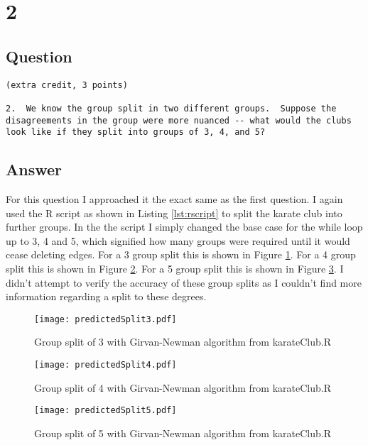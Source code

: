 \documentclass[letterpaper,11pt]{article}
\begin{document}
\clearpage


\section*{2}

\subsection*{Question}

\begin{verbatim}
(extra credit, 3 points)

2.  We know the group split in two different groups.  Suppose the
disagreements in the group were more nuanced -- what would the clubs
look like if they split into groups of 3, 4, and 5?
\end{verbatim}

\clearpage
\subsection*{Answer}

For this question I approached it the exact same as the first question. I again used the R script as shown in Listing \ref{lst:rscript} to split the karate club into further groups. In the the script I simply changed the base case for the while loop up to 3, 4 and 5, which signified how many groups were required until it would cease deleting edges. For a 3 group split this is shown in Figure \ref{fig:split3}. For a 4 group split this is shown in Figure \ref{fig:split4}. For a 5 group split this is shown in Figure \ref{fig:split5}. I didn't attempt to verify the accuracy of these group splits as I couldn't find more information regarding a split to these degrees.

\begin{figure}[h]
\centering
\texttt{[image: predictedSplit3.pdf]}
\caption{Group split of 3 with Girvan-Newman algorithm from karateClub.R}
\label{fig:split3}
\end{figure}

\begin{figure}[h]
\centering
\texttt{[image: predictedSplit4.pdf]}
\caption{Group split of 4 with Girvan-Newman algorithm from karateClub.R}
\label{fig:split4}
\end{figure}

\begin{figure}[h]
\centering
\texttt{[image: predictedSplit5.pdf]}
\caption{Group split of 5 with Girvan-Newman algorithm from karateClub.R}
\label{fig:split5}
\end{figure}
\end{document}
